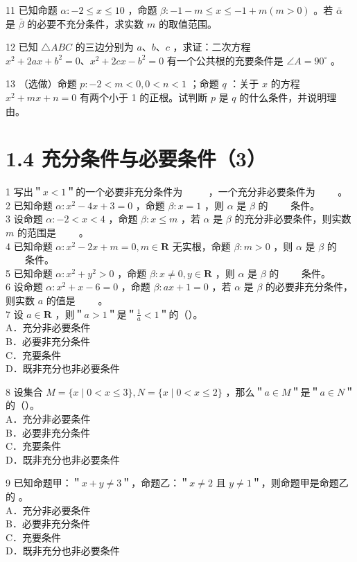 \documentclass[10pt]{article}
\begin{document}
11 已知命题 \(\alpha:-2 \leqslant x \leqslant 10\) ，命题 \(\beta:-1-m \leqslant x \leqslant-1+m(m>0)\) 。若 \(\bar{\alpha}\) 是 \(\bar{\beta}\) 的必要不充分条件，求实数 \(m\) 的取值范围。

12 已知 \(\triangle A B C\) 的三边分别为 \(a 、 b 、 c\) ，求证：二次方程 \(x^{2}+2 a x+b^{2}=0 、 x^{2}+2 c x-b^{2}=0\) 有一个公共根的充要条件是 \(\angle A=90^{\circ}\) 。

13 （选做）命题 \(p:-2<m<0,0<n<1\) ；命题 \(q\) ：关于 \(x\) 的方程 \(x^{2}+m x+n=0\) 有两个小于 1 的正根。试判断 \(p\) 是 \(q\) 的什么条件，并说明理由。

\section*{1.4 充分条件与必要条件（3）}
1 写出＂\(x<1\)＂的一个必要非充分条件为 \(\qquad\) ，一个充分非必要条件为 \(\qquad\)。\\
2 已知命题 \(\alpha: x^{2}-4 x+3=0\) ，命题 \(\beta: x=1\) ，则 \(\alpha\) 是 \(\beta\) 的 \(\qquad\)条件。\\
3 设命题 \(\alpha:-2<x<4\) ，命题 \(\beta: x \leqslant m\) ，若 \(\alpha\) 是 \(\beta\) 的充分非必要条件，则实数 \(m\) 的范围是 \(\qquad\)。\\
4 已知命题 \(\alpha: x^{2}-2 x+m=0, m \in \mathbf{R}\) 无实根，命题 \(\beta: m>0\) ，则 \(\alpha\) 是 \(\beta\) 的 \(\qquad\)条件。\\
5 已知命题 \(\alpha: x^{2}+y^{2}>0\) ，命题 \(\beta: x \neq 0, y \in \mathbf{R}\) ，则 \(\alpha\) 是 \(\beta\) 的 \(\qquad\)条件。\\
6 设命题 \(\alpha: x^{2}+x-6=0\) ，命题 \(\beta: a x+1=0\) ，若 \(\alpha\) 是 \(\beta\) 的必要非充分条件，则实数 \(a\) 的值是 \(\qquad\)。\\
7 设 \(a \in \mathbf{R}\) ，则＂\(a>1\)＂是＂\(\frac{1}{a}<1\)＂的（）。\\
A．充分非必要条件\\
B．必要非充分条件\\
C．充要条件\\
D．既非充分也非必要条件

8 设集合 \(M=\{x \mid 0<x \leqslant 3\}, N=\{x \mid 0<x \leqslant 2\}\) ，那么＂\(a \in M\)＂是＂\(a \in N\)＂的（）。\\
A．充分非必要条件\\
B．必要非充分条件\\
C．充要条件\\
D．既非充分也非必要条件

9 已知命题甲：＂\(x+y \neq 3\)＂，命题乙：＂\(x \neq 2\) 且 \(y \neq 1\)＂，则命题甲是命题乙的 。\\
A．充分非必要条件\\
B．必要非充分条件\\
C．充要条件\\
D．既非充分也非必要条件
\end{document}
